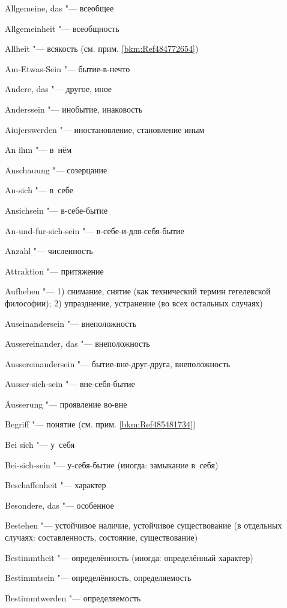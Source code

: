 \bigskip

\begin{multicols}{2}
Allgemeine, das "--- всеобщее

Allgemein\-heit "--- всеобщность

Allheit "--- всякость (см. прим. \ref{bkm:Ref484772654})

Am-Etwas-Sein "--- бытие-в-нечто

Andere, das "--- другое, иное

Anderssein "--- инобытие, инаковость

Aiujers\-werden "--- иностановление, становление иным

An ihm "--- в~нём

Anschauung "--- созерцание

An-sich "--- в~себе

Ansichsein "--- в-себе-бытие

An-und-fur-sich-sein "--- в-себе-и-для-себя-бытие

Anzahl "--- численность

Attraktion "--- притяжение

Aufheben "--- 1) снимание, снятие (как технический термин гегелевской
философии); 2) упразднение, устранение (во всех остальных случаях)

Ausein\-ander\-sein "--- внеположность

Ausser\-ein\-ander, das "--- внеположность

Ausser\-ein\-ander\-sein "--- бытие-вне-друг-друга, внеположность

Ausser-sich-sein "--- вне-себя-бытие

Äusserung "--- проявление во-вне

\bigskip

Begriff "--- понятие (см. прим. \ref{bkm:Ref485481734})

Bei sich "--- у~себя

Bei-sich-sein "--- у-себя-бытие (иногда: замыкание в~себя)

Beschaffen\-heit "--- характер

Besondere, das "--- особенное

Bestehen "--- устойчивое наличие, устойчивое существование (в
отдельных случаях: составленность, состояние, существование)

Bestimmt\-heit "--- определённость (иногда: определённый характер)

Bestimmt\-sein "--- определённость, определяемость

Bestimmt\-werden "--- определяемость


\end{multicols}
